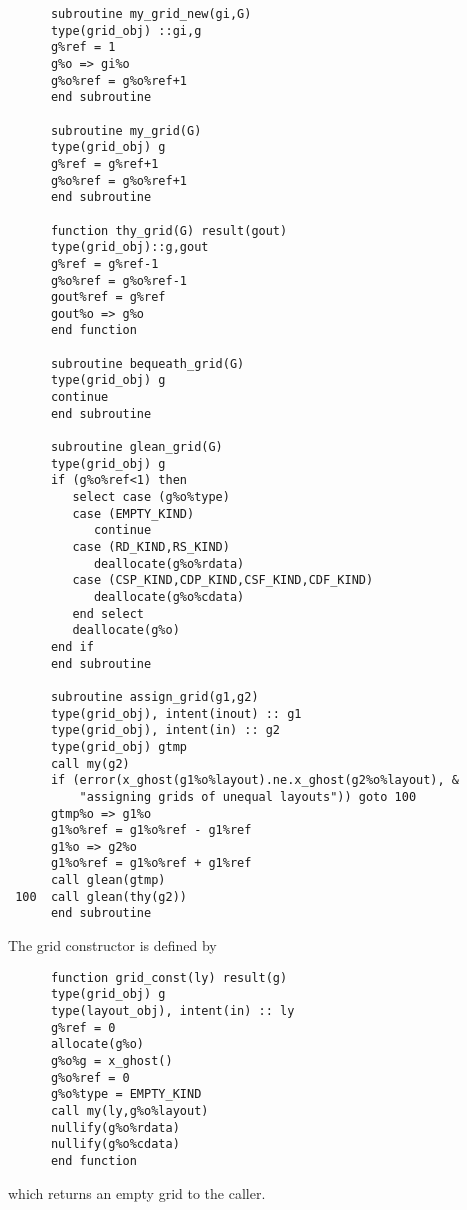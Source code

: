 \begin{verbatim}
      subroutine my_grid_new(gi,G)
      type(grid_obj) ::gi,g
      g%ref = 1
      g%o => gi%o
      g%o%ref = g%o%ref+1
      end subroutine

      subroutine my_grid(G)
      type(grid_obj) g
      g%ref = g%ref+1
      g%o%ref = g%o%ref+1
      end subroutine

      function thy_grid(G) result(gout)
      type(grid_obj)::g,gout
      g%ref = g%ref-1
      g%o%ref = g%o%ref-1
      gout%ref = g%ref
      gout%o => g%o
      end function

      subroutine bequeath_grid(G)
      type(grid_obj) g
      continue
      end subroutine

      subroutine glean_grid(G)
      type(grid_obj) g
      if (g%o%ref<1) then
         select case (g%o%type)
         case (EMPTY_KIND)
            continue
         case (RD_KIND,RS_KIND)
            deallocate(g%o%rdata)
         case (CSP_KIND,CDP_KIND,CSF_KIND,CDF_KIND)
            deallocate(g%o%cdata)
         end select
         deallocate(g%o)
      end if
      end subroutine

      subroutine assign_grid(g1,g2)
      type(grid_obj), intent(inout) :: g1
      type(grid_obj), intent(in) :: g2
      type(grid_obj) gtmp
      call my(g2)
      if (error(x_ghost(g1%o%layout).ne.x_ghost(g2%o%layout), &
          "assigning grids of unequal layouts")) goto 100
      gtmp%o => g1%o
      g1%o%ref = g1%o%ref - g1%ref
      g1%o => g2%o
      g1%o%ref = g1%o%ref + g1%ref
      call glean(gtmp)
 100  call glean(thy(g2))
      end subroutine

\end{verbatim}

The grid constructor is defined by
\begin{verbatim}
      function grid_const(ly) result(g)
      type(grid_obj) g
      type(layout_obj), intent(in) :: ly
      g%ref = 0
      allocate(g%o)
      g%o%g = x_ghost()
      g%o%ref = 0
      g%o%type = EMPTY_KIND
      call my(ly,g%o%layout)
      nullify(g%o%rdata)
      nullify(g%o%cdata)
      end function
\end{verbatim}
which returns an empty grid to the caller.

